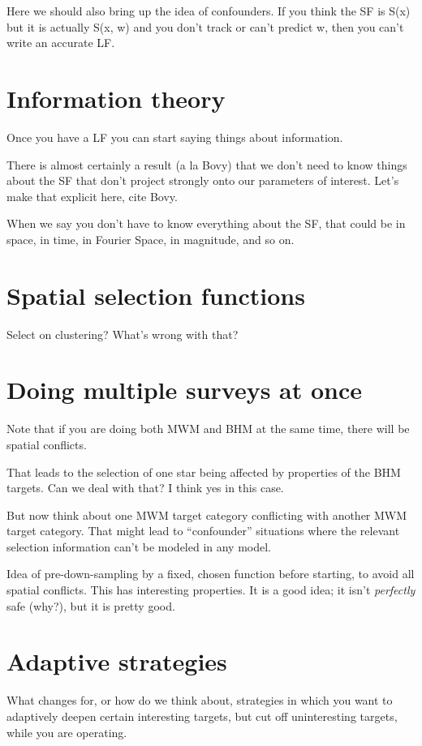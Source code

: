 \documentclass[modern]{aastex62}
\begin{document}
Here we should also bring up the idea of confounders. If you think the SF
is S(x) but it is actually S(x, w) and you don't track or can't predict w,
then you can't write an accurate LF.

\section{Information theory}

Once you have a LF you can start saying things about information.

There is almost certainly a result (a la Bovy) that we don't need to know
things about the SF that don't project strongly onto our parameters of interest.
Let's make that explicit here, cite Bovy.

When we say you don't have to know everything about the SF, that could be
in space, in time, in Fourier Space, in magnitude, and so on.

\section{Spatial selection functions}

Select on clustering? What's wrong with that?

\section{Doing multiple surveys at once}

Note that if you are doing both MWM and BHM at the same time, there will be
spatial conflicts.

That leads to the selection of one star being affected by properties of the
BHM targets. Can we deal with that? I think yes in this case.

But now think about one MWM target category conflicting with another MWM target
category. That might lead to ``confounder'' situations where the relevant selection
information can't be modeled in any model.

Idea of pre-down-sampling by a fixed, chosen function before starting, to avoid
all spatial conflicts. This has interesting properties. It is a good idea; it isn't
\emph{perfectly} safe (why?), but it is pretty good.

\section{Adaptive strategies}

What changes for, or how do we think about, strategies in which you want to
adaptively deepen certain interesting targets, but cut off uninteresting targets,
while you are operating.
\end{document}
